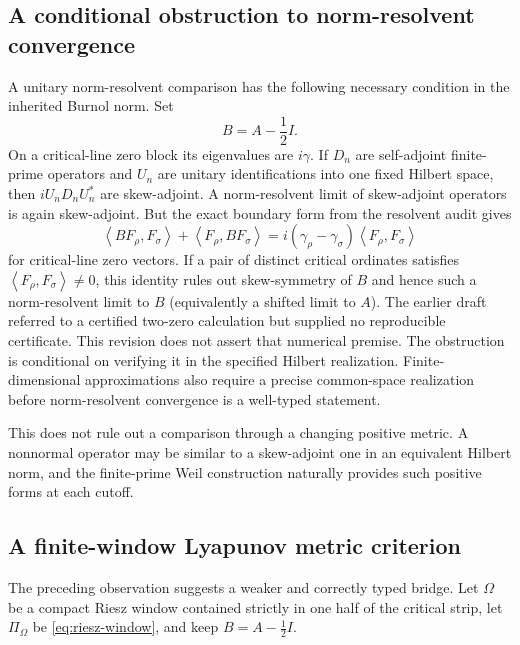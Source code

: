 \documentclass[11pt]{article}
\theoremstyle{remark}
\newcommand{\ip}[2]{\left\langle #1,#2\right\rangle}
\begin{document}
\subsection*{A conditional obstruction to norm-resolvent convergence}
A unitary norm-resolvent comparison has the following necessary condition in the inherited Burnol norm.  Set
\[
 B=A-\frac12 I.
\]
On a critical-line zero block its eigenvalues are $i\gamma$.  If $D_n$ are self-adjoint finite-prime operators and $U_n$ are unitary identifications into one fixed Hilbert space, then $iU_nD_nU_n^*$ are skew-adjoint.  A norm-resolvent limit of skew-adjoint operators is again skew-adjoint.  But the exact boundary form from the resolvent audit gives
\[
 \ip{BF_\rho}{F_\sigma}+\ip{F_\rho}{BF_\sigma}
 =i(\gamma_\rho-\gamma_\sigma)\ip{F_\rho}{F_\sigma}
\]
for critical-line zero vectors.  If a pair of distinct critical ordinates satisfies
$\ip{F_\rho}{F_\sigma}\ne0$, this identity rules out skew-symmetry of $B$
and hence such a norm-resolvent limit to $B$ (equivalently a shifted limit
to $A$). The earlier draft referred to a certified two-zero calculation
but supplied no reproducible certificate. This revision does not assert
that numerical premise. The obstruction is conditional on verifying it
in the specified Hilbert realization. Finite-dimensional approximations
also require a precise common-space realization before norm-resolvent
convergence is a well-typed statement.

This does not rule out a comparison through a changing positive metric.  A nonnormal operator may be similar to a skew-adjoint one in an equivalent Hilbert norm, and the finite-prime Weil construction naturally provides such positive forms at each cutoff.

\subsection*{A finite-window Lyapunov metric criterion}
The preceding observation suggests a weaker and correctly typed bridge.  Let $\Omega$ be a compact Riesz window contained strictly in one half of the critical strip, let $\Pi_\Omega$ be \eqref{eq:riesz-window}, and keep $B=A-\frac12I$.
\end{document}
